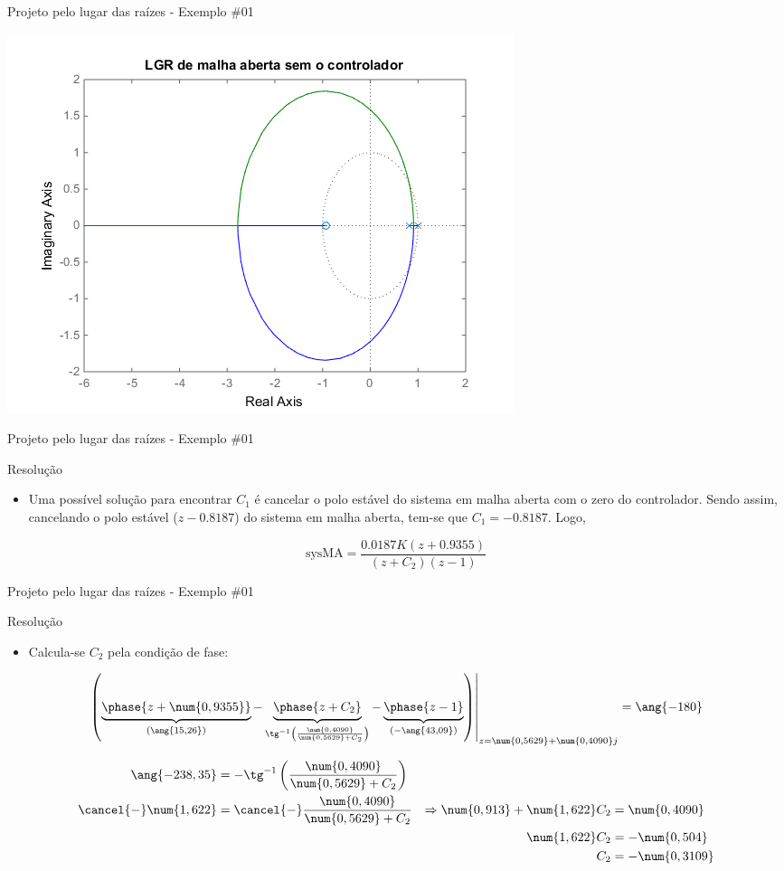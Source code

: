 \begin{frame}{Projeto pelo lugar das raízes - Exemplo \#01}
\centerline{\includegraphics[width=0.8\linewidth]{Figuras/Ch11/fig7.png}}
\end{frame}


\begin{frame}{Projeto pelo lugar das raízes - Exemplo \#01}
\begin{block}{Resolução}
\begin{itemize}
    \item Uma possível solução para encontrar $C_1$ é cancelar o polo estável do sistema em malha aberta com o zero do controlador. Sendo assim, cancelando o polo estável ($ z-\num{0,8187} $) do sistema em malha aberta, tem-se que $ C_1=-\num{0,8187} $. Logo,
\end{itemize}
\[ \text{sysMA}=\dfrac{\num{0,0187}K(z+\num{0,9355})}{(z+C_2)(z-1)} \]
\end{block}
\end{frame}


\begin{frame}{Projeto pelo lugar das raízes - Exemplo \#01}
\begin{block}{Resolução}
\begin{itemize}
    \item Calcula-se $ C_2 $ pela condição de fase:
\end{itemize}
	
	\[ \left. \left( \underbrace{\strut\phase{z+\num{0,9355}}}_{(\ang{15,26})}-\underbrace{\strut\phase{z+C_2}}_{\tg^{-1}\left( \frac{\num{0,4090}}{\num{0,5629}+C_2}\right)}-\underbrace{\strut\phase{z-1}}_{(-\ang{43,09})}\right) \right|_{z=\num{0,5629}+\num{0,4090}j}=\ang{-180} \]
	
	\begin{align*}
	\ang{-238,35}&=-\tg^{-1}\left( \frac{\num{0,4090}}{\num{0,5629}+C_2}\right)& &\\
	\cancel{-}\num{1,622}&=\cancel{-}\frac{\num{0,4090}}{\num{0,5629}+C_2}&\Rightarrow\num{0,913}+\num{1,622}C_2&=\num{0,4090}\\
	& & \num{1,622}C_2&=-\num{0,504}\\
	& & C_2&= -\num{0,3109}
	\end{align*}
\end{block}
\end{frame}


